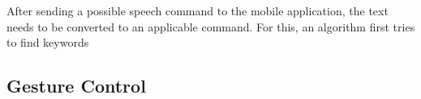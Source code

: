 After sending a possible speech command to the mobile application, the text needs to be converted to an applicable command. For this, an algorithm first tries to find keywords %

\subsection{Gesture Control}







